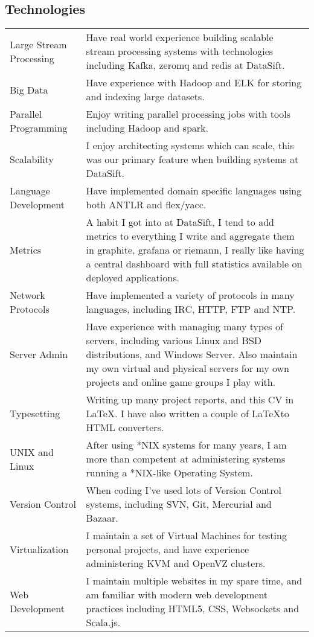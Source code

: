 \documentclass[a4paper]{article}
\begin{document}
\subsection*{Technologies}
\begin{tabular}{ l p{12.3cm} }
Large Stream Processing & Have real world experience building scalable stream processing systems with technologies including Kafka, zeromq and redis at DataSift.\\
Big Data & Have experience with Hadoop and ELK for storing and indexing large datasets.\\
Parallel Programming & Enjoy writing parallel processing jobs with tools including Hadoop and spark.\\
Scalability & I enjoy architecting systems which can scale, this was our primary feature when building systems at DataSift.\\
Language Development & Have implemented domain specific languages using both ANTLR and flex/yacc.\\
Metrics & A habit I got into at DataSift, I tend to add metrics to everything I write and aggregate them in graphite, grafana or riemann, I really like having a central dashboard with full statistics available on deployed applications.\\
Network Protocols & Have implemented a variety of protocols in many languages, including IRC, HTTP, FTP and NTP.\\
Server Admin & Have experience with managing many types of servers, including various Linux and BSD distributions, and Windows Server. Also maintain my own virtual and physical servers for my own projects and online game groups I play with.\\
Typesetting & Writing up many project reports, and this CV in \LaTeX. I have also written a couple of \LaTeX to HTML converters.\\
UNIX and Linux & After using *NIX systems for many years, I am more than competent at administering systems running a *NIX-like Operating System.\\
Version Control & When coding I've used lots of Version Control systems, including SVN, Git, Mercurial and Bazaar.\\
Virtualization & I maintain a set of Virtual Machines for testing personal projects, and have experience administering KVM and OpenVZ clusters.\\
Web Development & I maintain multiple websites in my spare time, and am familiar with modern web development practices including HTML5, CSS, Websockets and Scala.js.\\
\end{tabular}
\end{document}

